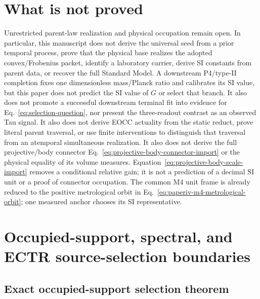\documentclass[11pt]{article}
\begin{document}
\section{What is not proved}

Unrestricted parent-law realization and physical occupation remain open.  In
particular, this manuscript does not
derive the universal seed from a prior temporal process, prove that the
physical base realizes the adopted convex/Frobenius packet, identify a
laboratory carrier, derive SI constants from parent data, or recover the full
Standard Model.  A downstream P4/type-II completion fixes one dimensionless
mass/Planck ratio and calibrates its SI value, but this paper does not predict
the SI value of \(G\) or select that branch.  It also does not promote a
successful downstream terminal fit into
evidence for Eq.~\eqref{eq:selection-question}, nor present the three-readout
contrast as an observed Tau signal.
It also does not derive EOCC actuality from the static reduct, prove literal
parent traversal, or use finite interventions to distinguish that traversal
from an atemporal simultaneous realization.
It also does not derive the full projective/body connector
Eq.~\eqref{eq:projective-body-connector-import} or the physical equality of
its volume measures.  Equation~\eqref{eq:projective-body-scale-import} removes
a conditional relative gain; it is not a prediction of a decimal SI unit or
a proof of connector occupation. The common M4 unit frame is already reduced
to the positive metrological orbit in
Eq.~\eqref{eq:paperiv-m4-metrological-orbit}; one measured anchor chooses its
SI representative.

\section{Occupied-support, spectral, and ECTR source-selection boundaries}
\label{sec:occupied-spectral-ectr-boundaries}

\subsection{Exact occupied-support selection theorem}
\end{document}
